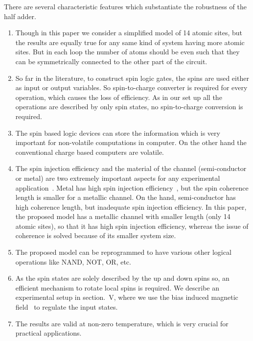 \documentclass[prb,aps,twocolumn,amsmath,amssymb,floatfix,superscriptaddress]{revtex4}
\begin{document}
There are several characteristic features which substantiate the
robustness of the half adder.

\begin{enumerate}

\item Though in this paper we consider a simplified model of 14 atomic sites,
but the results are equally true for any same kind of system having more atomic sites. But
in each loop the number of atoms should be even such that they can be symmetrically
connected to the other part of the circuit.
	
\item So far in the literature, to construct spin logic gates, the spins are used
either as input or output variables. So spin-to-charge converter
is required for every operation,  which causes the loss of efficiency. As in
our set up  all the operations are described by only spin states, no
spin-to-charge conversion is required.

\item The spin based logic devices can store the information which is very important for
non-volatile computations in computer. On the other hand the conventional charge based
computers are volatile.

\item The spin injection efficiency and the material of the channel (semi-conductor or
metal) are two extremely important aspects for any experimental application~\cite{ref14a}. 
Metal has high spin injection efficiency~\cite{LGS5}, but the spin coherence length is
smaller for a metallic channel. On the hand, semi-conductor has high coherence length, but
inadequate spin injection efficiency. In this paper, the proposed model has a metallic channel
with smaller length (only 14 atomic sites), so that it has high spin injection efficiency,
whereas the issue of coherence is solved because of its smaller system size.
		
\item The proposed model can be reprogrammed to have various other logical
operations like NAND, NOT, OR, etc.

\item As the spin states are solely described by the up and down spins so, an
efficient mechanism to rotate local spins is required. We describe an experimental setup in
section.~V, where we use the bias induced magnetic field~\cite{ref15,cite22} to regulate
the input states.

\item The results are valid at non-zero temperature, which is very crucial for
practical applications.
		
\end{enumerate}
\end{document}
